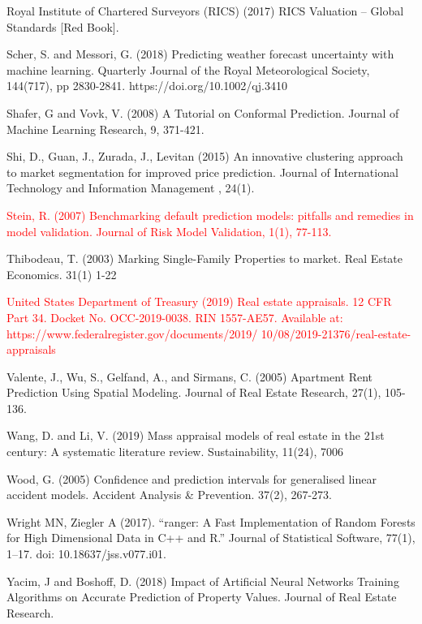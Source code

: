 \documentclass[colTwo]{anon}
\theoremstyle{definition}
\begin{document}
\begin{thebibliography}{50}
\harvarditem{}{}{}Royal Institute of Chartered Surveyors (RICS) (2017) RICS Valuation – Global Standards [Red Book]. 

\harvarditem{}{}{}Scher, S. and Messori, G. (2018) Predicting weather forecast uncertainty with machine learning. Quarterly Journal of the Royal Meteorological Society, 144(717), pp 2830-2841.  https://doi.org/10.1002/qj.3410

\harvarditem{}{}{}Shafer, G and Vovk, V. (2008) A Tutorial on Conformal Prediction. Journal of Machine Learning Research, 9, 371-421. 

\harvarditem{}{}{}Shi, D., Guan, J., Zurada, J., Levitan (2015) An innovative clustering approach to market segmentation for improved price prediction. Journal of International Technology and Information Management , 24(1).  

\harvarditem{}{}{}\textcolor{red}{Stein, R. (2007) Benchmarking default prediction models: pitfalls and remedies in model validation. Journal of Risk Model Validation, 1(1), 77-113.} 

\harvarditem{}{}{}Thibodeau, T. (2003) Marking Single-Family Properties to market. Real Estate Economics. 31(1) 1-22

\harvarditem{}{}{}\textcolor{red}{United States Department of Treasury (2019) Real estate appraisals. 12 CFR Part 34. Docket No. OCC-2019-0038. RIN 1557-AE57. Available at: https://www.federalregister.gov/documents/2019/ 10/08/2019-21376/real-estate-appraisals}

\harvarditem{}{}{}Valente, J., Wu, S., Gelfand, A., and Sirmans, C. (2005) Apartment Rent Prediction Using Spatial Modeling. Journal of Real Estate Research, 27(1), 105-136. 

\harvarditem{}{}{}Wang, D. and Li, V. (2019) Mass appraisal models of real estate in the 21st century: A systematic literature review.  Sustainability, 11(24), 7006

\harvarditem{}{}{}Wood, G. (2005) Confidence and prediction intervals for generalised linear accident models. Accident Analysis \& Prevention. 37(2), 267-273. 

\harvarditem{}{}{}Wright MN, Ziegler A (2017). “ranger: A Fast Implementation of Random Forests for High Dimensional Data in C++ and R.” Journal of Statistical Software, 77(1), 1–17. doi: 10.18637/jss.v077.i01.

\harvarditem{}{}{}Yacim, J and Boshoff, D. (2018) Impact of Artificial Neural Networks Training Algorithms on Accurate Prediction of Property Values. Journal of Real Estate Research. 


\end{thebibliography}
\end{document}
